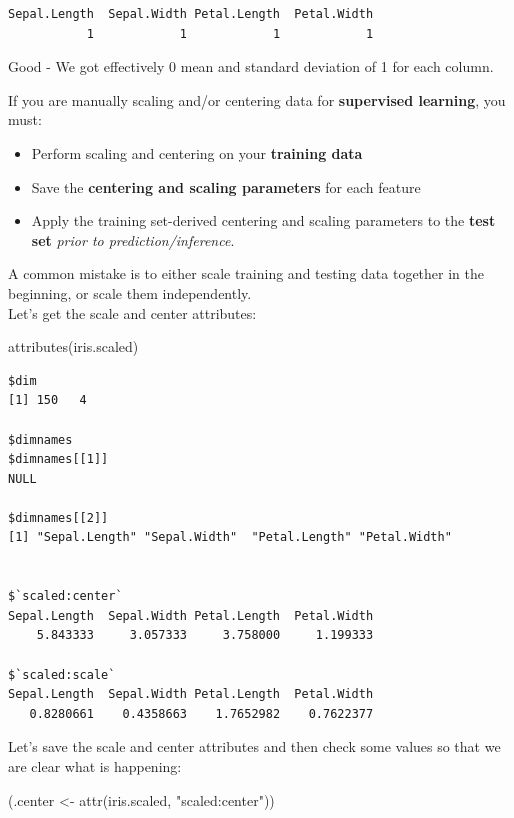 \documentclass[
]{book}
\newenvironment{Shaded}{\begin{snugshade}}{\end{snugshade}}
\newcommand{\FunctionTok}[1]{\textcolor[rgb]{0.00,0.00,0.00}{#1}}
\newcommand{\NormalTok}[1]{#1}
\newcommand{\OtherTok}[1]{\textcolor[rgb]{0.56,0.35,0.01}{#1}}
\newcommand{\StringTok}[1]{\textcolor[rgb]{0.31,0.60,0.02}{#1}}
\providecommand{\tightlist}{%
  \setlength{\itemsep}{0pt}\setlength{\parskip}{0pt}}
\begin{document}
\begin{verbatim}
Sepal.Length  Sepal.Width Petal.Length  Petal.Width 
           1            1            1            1 
\end{verbatim}

Good - We got effectively 0 mean and standard deviation of 1 for each column.

\begin{rmdnote}
If you are manually scaling and/or centering data for \textbf{supervised
learning}, you must:

\begin{itemize}
\tightlist
\item
  Perform scaling and centering on your \textbf{training data}
\item
  Save the \textbf{centering and scaling parameters} for each feature
\item
  Apply the training set-derived centering and scaling parameters to the
  \textbf{test set} \emph{prior to prediction/inference}.
\end{itemize}
\end{rmdnote}

A common mistake is to either scale training and testing data together in the beginning, or scale them independently.\\
Let's get the scale and center attributes:

\begin{Shaded}
\begin{Highlighting}[]
\FunctionTok{attributes}\NormalTok{(iris.scaled)}
\end{Highlighting}
\end{Shaded}

\begin{verbatim}
$dim
[1] 150   4

$dimnames
$dimnames[[1]]
NULL

$dimnames[[2]]
[1] "Sepal.Length" "Sepal.Width"  "Petal.Length" "Petal.Width" 


$`scaled:center`
Sepal.Length  Sepal.Width Petal.Length  Petal.Width 
    5.843333     3.057333     3.758000     1.199333 

$`scaled:scale`
Sepal.Length  Sepal.Width Petal.Length  Petal.Width 
   0.8280661    0.4358663    1.7652982    0.7622377 
\end{verbatim}

Let's save the scale and center attributes and then check some values so that we are clear what is happening:

\begin{Shaded}
\begin{Highlighting}[]
\NormalTok{(.center }\OtherTok{\textless{}{-}} \FunctionTok{attr}\NormalTok{(iris.scaled, }\StringTok{"scaled:center"}\NormalTok{))}
\end{Highlighting}
\end{Shaded}
\end{document}
